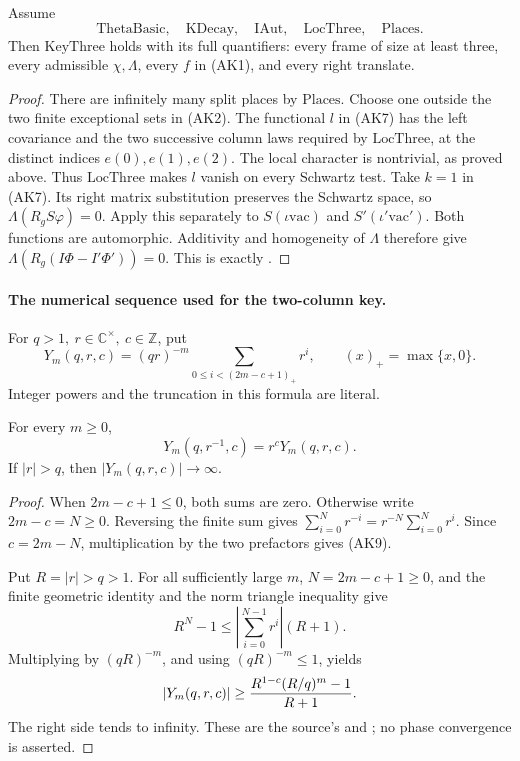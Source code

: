 \begin{srproposition}
\label{prop:sr-source-key-three-producer}
Assume
\[
 \mathrm{ThetaBasic},\quad\mathrm{KDecay},\quad\mathrm{IAut},
 \quad\mathrm{LocThree},\quad\mathrm{Places}.
\]
Then \(\mathrm{KeyThree}\) holds with its full quantifiers:
every frame of size at least three, every admissible
\(\chi,\Lambda\), every \(f\) in (AK1), and every right translate.
\end{srproposition}
\begin{proof}
There are infinitely many split places by \(\mathrm{Places}\).
Choose one outside the two finite exceptional sets in (AK2).
The functional \(l\) in (AK7) has the left covariance and the two
successive column laws required by \(\mathrm{LocThree}\), at the
distinct indices \(e(0),e(1),e(2)\).
The local character is nontrivial, as proved above.
Thus \(\mathrm{LocThree}\) makes \(l\) vanish on every Schwartz test.
Take \(k=1\) in (AK7). Its right matrix substitution preserves the
Schwartz space, so \(\Lambda(R_gS\varphi)=0\).
Apply this separately to \(S(\iota\mathrm{vac})\) and
\(S'(\iota'\mathrm{vac}')\).
Both functions are automorphic. Additivity and homogeneity of
\(\Lambda\) therefore give
\(\Lambda(R_g(I\Phi-I'\Phi'))=0\).
This is exactly .
\end{proof}

\paragraph{The numerical sequence used for the two-column key.}
For \(q>1,\ r\in\mathbb C^\times,\ c\in\mathbb Z\), put
\[
 Y_m(q,r,c)=(qr)^{-m}
       \sum_{0\le i<(2m-c+1)_+}r^i,\qquad
                     (x)_+=\max\{x,0\}.
 \tag{AK8}\label{eq:sr-source-key-two-sequence}
\]
Integer powers and the truncation in this formula are literal.

\begin{srlemma}\label{lem:sr-source-key-two-sequence}
For every \(m\ge0\),
\[
 Y_m(q,r^{-1},c)=r^cY_m(q,r,c).
 \tag{AK9}\label{eq:sr-source-key-two-inversion}
\]
If \(|r|>q\), then \(|Y_m(q,r,c)|\to\infty\).
\end{srlemma}
\begin{proof}
When \(2m-c+1\le0\), both sums are zero.
Otherwise write \(2m-c=N\ge0\).
Reversing the finite sum gives
\(\sum_{i=0}^Nr^{-i}=r^{-N}\sum_{i=0}^Nr^i\).
Since \(c=2m-N\), multiplication by the two prefactors gives (AK9).

Put \(R=|r|>q>1\).
For all sufficiently large \(m\), \(N=2m-c+1\ge0\), and
the finite geometric identity and the norm triangle inequality give
\[
 R^N-1
   \le \left|\sum_{i=0}^{N-1}r^i\right|(R+1).
\]
Multiplying by \((qR)^{-m}\), and using
\((qR)^{-m}\le1\), yields
\[
 |Y_m(q,r,c)|
       \ge {R^{1-c}(R/q)^m-1\over R+1}.
\]
The right side tends to infinity.
These are the source's  and
; no phase convergence is asserted.
\end{proof}

